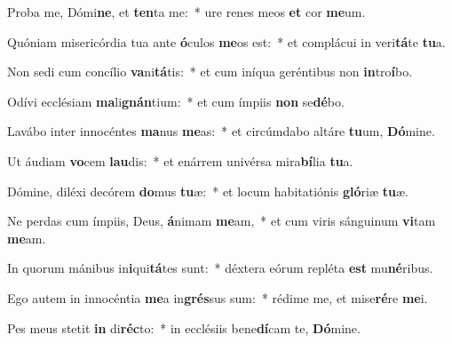 \item Proba me, Dómi\textbf{ne}, et \textbf{ten}ta me:~* ure renes meos \textbf{et} cor \textbf{me}um.
\item Quóniam misericórdia tua ante \textbf{ó}culos \textbf{me}os est:~* et complácui in veri\textbf{tá}te \textbf{tu}a.
\item Non sedi cum concílio \textbf{va}ni\textbf{tá}tis:~* et cum iníqua geréntibus non \textbf{in}tro\textbf{í}bo.
\item Odívi ecclésiam \textbf{ma}li\textbf{gnán}tium:~* et cum ímpiis \textbf{non} se\textbf{dé}bo.
\item Lavábo inter innocéntes \textbf{ma}nus \textbf{me}as:~* et circúmdabo altáre \textbf{tu}um, \textbf{Dó}mine.
\item Ut áudiam \textbf{vo}cem \textbf{lau}dis:~* et enárrem univérsa mira\textbf{bí}lia \textbf{tu}a.
\item Dómine, diléxi decórem \textbf{do}mus \textbf{tu}æ:~* et locum habitatiónis \textbf{gló}riæ \textbf{tu}æ.
\item Ne perdas cum ímpiis, Deus, \textbf{á}nimam \textbf{me}am,~* et cum viris sánguinum \textbf{vi}tam \textbf{me}am.
\item In quorum mánibus in\textbf{i}qui\textbf{tá}tes sunt:~* déxtera eórum repléta \textbf{est} mu\textbf{né}ribus.
\item Ego autem in innocéntia \textbf{me}a in\textbf{grés}sus sum:~* rédime me, et mise\textbf{ré}re \textbf{me}i.
\item Pes meus stetit \textbf{in} di\textbf{réc}to:~* in ecclésiis bene\textbf{dí}cam te, \textbf{Dó}mine.
